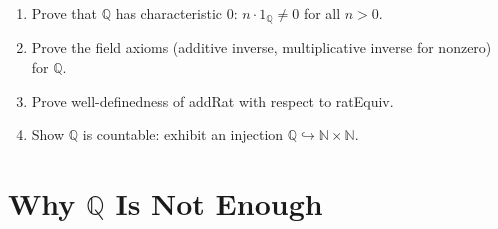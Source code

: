 \documentclass[12pt, openany]{book}
\theoremstyle{plain}
\theoremstyle{definition}
\theoremstyle{remark}
\newcommand{\N}{\mathbb{N}}
\newcommand{\Q}{\mathbb{Q}}
\newcommand{\li}[1]{{\ttfamily\small\color{tealaccent}#1}}
\begin{document}
\begin{exbox}
\begin{enumerate}
  \item Prove that $\Q$ has characteristic $0$: $n \cdot 1_\Q \neq 0$ for all $n > 0$.
  \item Prove the field axioms (additive inverse, multiplicative inverse for nonzero) for $\Q$.
  \item Prove well-definedness of \li{addRat} with respect to \li{ratEquiv}.
  \item Show $\Q$ is countable: exhibit an injection $\Q \hookrightarrow \N \times \N$.
\end{enumerate}
\end{exbox}
\color{black}

\chapter{Why \texorpdfstring{$\Q$}{Q} Is Not Enough}
\color{black}
\end{document}
